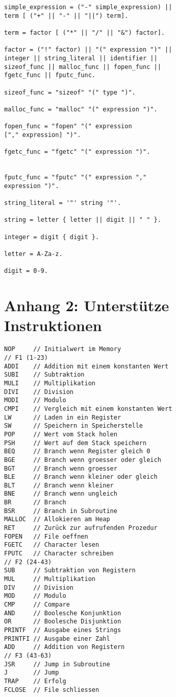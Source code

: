 \documentclass[a4paper,12pt]{article}
\begin{document}
\begin{lstlisting}
simple_expression = ("-" simple_expression) ||
term [ ("+" || "-" || "||") term].

term = factor [ ("*" || "/" || "&") factor].

factor = ("!" factor) || "(" expression ")" || 
integer || string_literal || identifier || 
sizeof_func || malloc_func || fopen_func ||
fgetc_func || fputc_func.

sizeof_func = "sizeof" "(" type ")".

malloc_func = "malloc" "(" expression ")".

fopen_func = "fopen" "(" expression 
["," expression] ")".

fgetc_func = "fgetc" "(" expression ")".


fputc_func = "fputc" "(" expression ","
expression ")".

string_literal = '"' string '"'.

string = letter { letter || digit || " " }.

integer = digit { digit }.

letter = A-Za-z.

digit = 0-9.
	\end{lstlisting}
	
	\newpage
	\section{Anhang 2: Unterstütze Instruktionen}
	\begin{lstlisting}
NOP 	// Initialwert im Memory
// F1 (1-23)
ADDI	// Addition mit einem konstanten Wert
SUBI	// Subtraktion
MULI	// Multiplikation
DIVI	// Division
MODI	// Modulo
CMPI	// Vergleich mit einem konstanten Wert
LW  	// Laden in ein Register
SW  	// Speichern in Speicherstelle
POP 	// Wert vom Stack holen
PSH 	// Wert auf dem Stack speichern
BEQ 	// Branch wenn Register gleich 0
BGE 	// Branch wenn groesser oder gleich
BGT 	// Branch wenn groesser
BLE 	// Branch wenn kleiner oder gleich
BLT 	// Branch wenn kleiner
BNE 	// Branch wenn ungleich
BR  	// Branch
BSR 	// Branch in Subroutine
MALLOC 	// Allokieren am Heap
RET 	// Zurück zur aufrufenden Prozedur
FOPEN 	// File oeffnen
FGETC 	// Character lesen
FPUTC 	// Character schreiben
// F2 (24-43)
SUB 	// Subtraktion von Registern
MUL 	// Multiplikation
DIV 	// Division
MOD 	// Modulo
CMP 	// Compare
AND 	// Boolesche Konjunktion
OR  	// Boolesche Disjunktion
PRINTF 	// Ausgabe eines Strings
PRINTFI // Ausgabe einer Zahl
ADD 	// Addition von Registern
// F3 (43-63)
JSR 	// Jump in Subroutine
J   	// Jump
TRAP 	// Erfolg
FCLOSE 	// File schliessen	\end{lstlisting}
\end{document}
